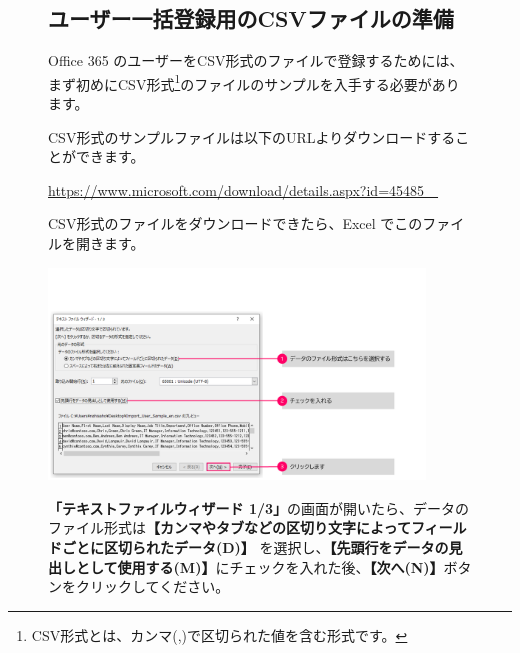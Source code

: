 \begin{figure}[h]
    \subsection{ユーザー一括登録用のCSVファイルの準備}

    \hspace{8pt} Office 365 のユーザーをCSV形式のファイルで登録するためには、まず初めにCSV形式\footnote{CSV形式とは、カンマ(,)で区切られた値を含む形式です。}のファイルのサンプルを入手する必要があります。

    \hspace{8pt} CSV形式のサンプルファイルは以下のURLよりダウンロードすることができます。

    \hspace{24pt} \url{https://www.microsoft.com/download/details.aspx?id=45485　}

    \hspace{8pt} CSV形式のファイルをダウンロードできたら、Excel でこのファイルを開きます。
\end{figure}



\begin{figure}[h]
    \begin{minipage}{0.6\textwidth}
        \vspace{-0.5cm}
        \includegraphics[width=10cm]{figures/CSV_Import-1.png}
    \end{minipage}
    \begin{minipage}{0.4\textwidth}
        \textbf{「テキストファイルウィザード 1/3」}の画面が開いたら、データのファイル形式は\textbf{【カンマやタブなどの区切り文字によってフィールドごとに区切られたデータ(D)】} を選択し、\textbf{【先頭行をデータの見出しとして使用する(M)】}にチェックを入れた後、\textbf{【次へ(N)】}ボタンをクリックしてください。
    \end{minipage}
\end{figure}

